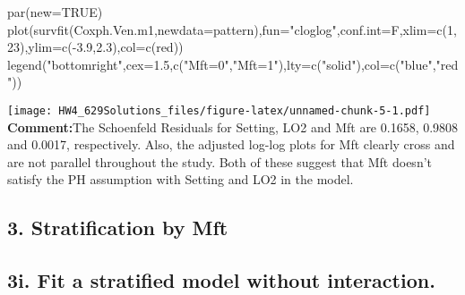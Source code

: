 \documentclass[
]{article}
\newenvironment{Shaded}{\begin{snugshade}}{\end{snugshade}}
\newcommand{\AttributeTok}[1]{\textcolor[rgb]{0.77,0.63,0.00}{#1}}
\newcommand{\CommentTok}[1]{\textcolor[rgb]{0.56,0.35,0.01}{\textit{#1}}}
\newcommand{\ConstantTok}[1]{\textcolor[rgb]{0.00,0.00,0.00}{#1}}
\newcommand{\DecValTok}[1]{\textcolor[rgb]{0.00,0.00,0.81}{#1}}
\newcommand{\FloatTok}[1]{\textcolor[rgb]{0.00,0.00,0.81}{#1}}
\newcommand{\FunctionTok}[1]{\textcolor[rgb]{0.00,0.00,0.00}{#1}}
\newcommand{\NormalTok}[1]{#1}
\newcommand{\OtherTok}[1]{\textcolor[rgb]{0.56,0.35,0.01}{#1}}
\newcommand{\SpecialCharTok}[1]{\textcolor[rgb]{0.00,0.00,0.00}{#1}}
\newcommand{\StringTok}[1]{\textcolor[rgb]{0.31,0.60,0.02}{#1}}
\begin{document}
\begin{Shaded}
\begin{Highlighting}[]
\FunctionTok{par}\NormalTok{(}\AttributeTok{new=}\ConstantTok{TRUE}\NormalTok{)}
\FunctionTok{plot}\NormalTok{(}\FunctionTok{survfit}\NormalTok{(Coxph.Ven.m1,}\AttributeTok{newdata=}\NormalTok{pattern),}\AttributeTok{fun=}\StringTok{"cloglog"}\NormalTok{,}\AttributeTok{conf.int=}\NormalTok{F,}\AttributeTok{xlim=}\FunctionTok{c}\NormalTok{(}\DecValTok{1}\NormalTok{,}\DecValTok{23}\NormalTok{),}\AttributeTok{ylim=}\FunctionTok{c}\NormalTok{(}\SpecialCharTok{{-}}\FloatTok{3.9}\NormalTok{,}\FloatTok{2.3}\NormalTok{),}\AttributeTok{col=}\FunctionTok{c}\NormalTok{(}\StringTok{\textquotesingle{}red\textquotesingle{}}\NormalTok{))}
\FunctionTok{legend}\NormalTok{(}\StringTok{"bottomright"}\NormalTok{,}\AttributeTok{cex=}\FloatTok{1.5}\NormalTok{,}\FunctionTok{c}\NormalTok{(}\StringTok{"Mft=0"}\NormalTok{,}\StringTok{"Mft=1"}\NormalTok{),}\AttributeTok{lty=}\FunctionTok{c}\NormalTok{(}\StringTok{"solid"}\NormalTok{),}\AttributeTok{col=}\FunctionTok{c}\NormalTok{(}\StringTok{"blue"}\NormalTok{,}\StringTok{"red"}\NormalTok{))}
\end{Highlighting}
\end{Shaded}

\texttt{[image: HW4\_629Solutions\_files/figure-latex/unnamed-chunk-5-1.pdf]}
\textbf{Comment:}The Schoenfeld Residuals for Setting, LO2 and Mft are
0.1658, 0.9808 and 0.0017, respectively. Also, the adjusted log-log
plots for Mft clearly cross and are not parallel throughout the study.
Both of these suggest that Mft doesn't satisfy the PH assumption with
Setting and LO2 in the model.

\hypertarget{stratification-by-mft}{%
\subsection{3. Stratification by Mft}\label{stratification-by-mft}}

\hypertarget{i.-fit-a-stratified-model-without-interaction.}{%
\subsection{3i. Fit a stratified model without
interaction.}\label{i.-fit-a-stratified-model-without-interaction.}}

\begin{Shaded}
\end{Shaded}
\end{document}
